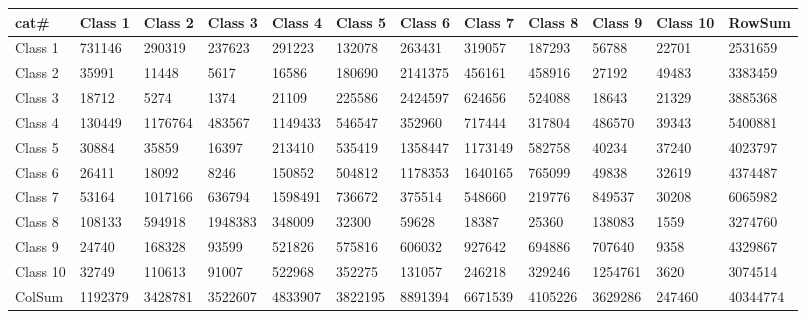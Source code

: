 \begin{table}[!ht]
    \centering
    \begin{tabular}{|l|l|l|l|l|l|l|l|l|l|l|l|}
    \hline
        \textbf{cat\#} & \textbf{Class 1} & \textbf{Class 2} & \textbf{Class 3} & \textbf{Class 4} & \textbf{Class 5} & \textbf{Class 6} & \textbf{Class 7} & \textbf{Class 8} & \textbf{Class 9} & \textbf{Class 10} & \textbf{RowSum} \\ \hline
        Class 1 & 731146 & 290319 & 237623 & 291223 & 132078 & 263431 & 319057 & 187293 & 56788 & 22701 & 2531659 \\ \hline
        Class 2 & 35991 & 11448 & 5617 & 16586 & 180690 & 2141375 & 456161 & 458916 & 27192 & 49483 & 3383459 \\ \hline
        Class 3 & 18712 & 5274 & 1374 & 21109 & 225586 & 2424597 & 624656 & 524088 & 18643 & 21329 & 3885368 \\ \hline
        Class 4 & 130449 & 1176764 & 483567 & 1149433 & 546547 & 352960 & 717444 & 317804 & 486570 & 39343 & 5400881 \\ \hline
        Class 5 & 30884 & 35859 & 16397 & 213410 & 535419 & 1358447 & 1173149 & 582758 & 40234 & 37240 & 4023797 \\ \hline
        Class 6 & 26411 & 18092 & 8246 & 150852 & 504812 & 1178353 & 1640165 & 765099 & 49838 & 32619 & 4374487 \\ \hline
        Class 7 & 53164 & 1017166 & 636794 & 1598491 & 736672 & 375514 & 548660 & 219776 & 849537 & 30208 & 6065982 \\ \hline
        Class 8 & 108133 & 594918 & 1948383 & 348009 & 32300 & 59628 & 18387 & 25360 & 138083 & 1559 & 3274760 \\ \hline
        Class 9 & 24740 & 168328 & 93599 & 521826 & 575816 & 606032 & 927642 & 694886 & 707640 & 9358 & 4329867 \\ \hline
        Class 10 & 32749 & 110613 & 91007 & 522968 & 352275 & 131057 & 246218 & 329246 & 1254761 & 3620 & 3074514 \\ \hline
        ColSum & 1192379 & 3428781 & 3522607 & 4833907 & 3822195 & 8891394 & 6671539 & 4105226 & 3629286 & 247460 & 40344774 \\ \hline
    \end{tabular}
\end{table}